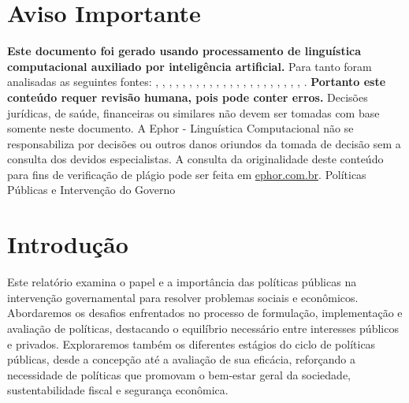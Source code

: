 \documentclass[
   article,       
   12pt,          
   oneside,       
   a4paper,       
   english,       
   brazil,        
   sumario=tradicional
   ]{abntex2}
\begin{document}
\frenchspacing 
\maketitle

\textual
\section{Aviso Importante}
\textbf{Este documento foi gerado usando processamento de linguística computacional auxiliado por inteligência artificial.} Para tanto foram analisadas as seguintes fontes:  \cite{A_CAUSA_E_AS_POLITICAS_DE_DIREITOS_HUMANOS_NO}, \cite{Ciclo_de_Politicas_Publicas_por_que_e_importa}, \cite{Conheca_o_ciclo_das_politicas_publicas__Polit}, \cite{Educacao_Inclusiva_Conheca_o_historico_da_leg}, \cite{Em_Buenos_Aires_Silvio_Almeida_defende_a_inst}, \cite{Entendendo_a_Tipologia_de_Politicas_Publicas_}, \cite{Escola_Nacional_de_Administracao_Publica__Wik}, \cite{Especialista_em_politicas_publicas_e_gestao_g}, \cite{FEDERALISMO_E_POLITICAS_PUBLICAS_NO_BRASIL_Ho}, \cite{Institucionalizacao_das_politicas_em_Direitos}, \cite{Ministerio_do_Planejamento_e_Orcamento__Wikip}, \cite{Ministro_defende_que_direitos_humanos_precisa}, \cite{Politica_conceito_politicas_publicas_e_partid}, \cite{Politica_publica__o_que_e_tipos_de_politicas_}, \cite{Politica_publica__Wikipedia_a_enciclopedia_li}, \cite{Politicas_publicas__Wikipedia_la_enciclopedia}, \cite{Politicas_Publicas_entenda_o_que_sao_para_que}, \cite{Politicas_Publicas_o_que_sao_e_para_que_serve}, \cite{Politicas_publicas_o_que_sao_e_para_que_serve}, \cite{Politicas_publicas_o_que_sao_quem_faz_e_tipos}, \cite{Politicas_publicas_o_que_sao_tipos_e_exemplos}, \cite{Revista_USP_119__Dossie_1_Democracia_e_politi}, \cite{TCU_Ciclo_das_politicas_publicas__Tudo_o_que_}.
\textbf{Portanto este conteúdo requer revisão humana, pois pode conter erros.} Decisões jurídicas, de saúde, financeiras ou similares não devem ser tomadas com base somente neste documento. A Ephor - Linguística Computacional não se responsabiliza por decisões ou outros danos oriundos da tomada de decisão sem a consulta dos devidos especialistas.
A consulta da originalidade deste conteúdo para fins de verificação de plágio pode ser feita em \href{http://www.ephor.com.br}{ephor.com.br}.
Políticas Públicas e Intervenção do Governo

\section{Introdução}
Este relatório examina o papel e a importância das políticas públicas na intervenção governamental para resolver problemas sociais e econômicos. Abordaremos os desafios enfrentados no processo de formulação, implementação e avaliação de políticas, destacando o equilíbrio necessário entre interesses públicos e privados. Exploraremos também os diferentes estágios do ciclo de políticas públicas, desde a concepção até a avaliação de sua eficácia, reforçando a necessidade de políticas que promovam o bem-estar geral da sociedade, sustentabilidade fiscal e segurança econômica.
\end{document}
